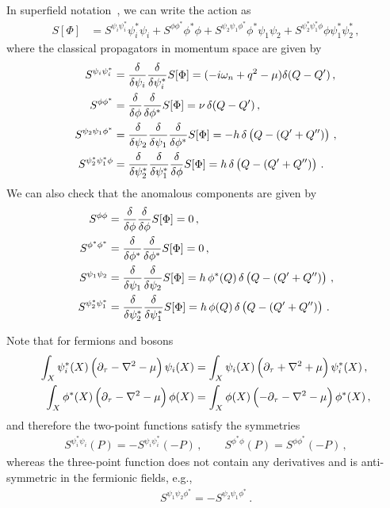 In superfield notation~\cite{Pawlowski2021}, we can write the action as
\begin{align}
	\label{eq:superfield-action}
    S[\Phi] &= S^{\psi_i\psi^*_i} \psi^*_i\psi_i + S^{\phi\phi^*} \phi^*\phi
    + S^{\psi_2\psi_1\phi^*} \phi^*\psi_1\psi_2 + S^{\psi^*_2\psi^*_1\phi}
    \phi\psi^*_1\psi^*_2 \,,
\end{align}
where the classical propagators in momentum space are given by
\begin{align}
    S^{\psi_i\psi^*_i} &= \frac{\delta}{\delta\psi_i}\frac{\delta}{\delta\psi^*_i} S[\Phi] 
    = (-i\omega_n + q^2 - \mu) \delta(Q-Q') \,, \notag \\
    S^{\phi\phi^*} &= \frac{\delta}{\delta\phi}\frac{\delta}{\delta\phi^*} S[\Phi]
    = \nu\, \delta(Q-Q') \,, \notag \\
    S^{\psi_2\psi_1\phi^*} &= \frac{\delta}{\delta\psi_2}\frac{\delta}{\delta\psi_1}
    \frac{\delta}{\delta\phi^*} S[\Phi] 
    = -h \, \delta\left(Q - (Q'+Q'')\right) \,, \notag \\
    S^{\psi^*_2\psi^*_1\phi} &= \frac{\delta}{\delta\psi^*_2}\frac{\delta}{\delta\psi^*_1}
    \frac{\delta}{\delta\phi} S[\Phi]
    = h \, \delta\left(Q - (Q'+Q'')\right) \,.
\end{align}
We can also check that the anomalous components are given by
\begin{align}
	S^{\phi\phi} &= \frac{\delta}{\delta\phi}\frac{\delta}{\delta\phi} S[\Phi] = 0 \,, \notag \\
	S^{\phi^*\phi^*} &= \frac{\delta}{\delta\phi^*}\frac{\delta}{\delta\phi^*} S[\Phi] = 0 \,, \notag \\
	S^{\psi_1\psi_2} &= \frac{\delta}{\delta\psi_1}\frac{\delta}{\delta\psi_2} S[\Phi] 
	= h\, \phi^*(Q)\, \delta\left(Q - (Q'+Q'')\right) \,, \notag \\
	S^{\psi^*_2\psi^*_1} &= \frac{\delta}{\delta\psi^*_2}\frac{\delta}{\delta\psi^*_1} S[\Phi]
	= h\, \phi(Q)\, \delta\left(Q - (Q'+Q'')\right) \,.
\end{align}

Note that for fermions and bosons
\begin{align}
    \int_X \psi^*_i(X) \left(\partial_{\tau} - \nabla^2 - \mu\right) \psi_i(X)
    &= \int_X \psi_i(X) \left(\partial_{\tau} + \nabla^2 + \mu\right) \psi^*_i(X) \,, \notag \\
    \int_X \phi^*(X) \left(\partial_{\tau} - \nabla^2 - \mu\right) \phi(X)
    &= \int_X \phi(X) \left(-\partial_{\tau} - \nabla^2 - \mu\right) \phi^*(X) \,,
\end{align}
and therefore the two-point functions satisfy the symmetries
\begin{align}
    S^{\psi^*_i\psi_i}(P) = -S^{\psi_i\psi^*_i}(-P) \,, \qquad
    S^{\phi^*\phi}(P) = S^{\phi\phi^*}(-P) \,,
\end{align}
whereas the three-point function does not contain any derivatives
and is anti-symmetric in the fermionic fields, e.g.,
\begin{align}
    S^{\psi_1\psi_2\phi^*} = -S^{\psi_2\psi_1\phi^*}  \,.
\end{align}

